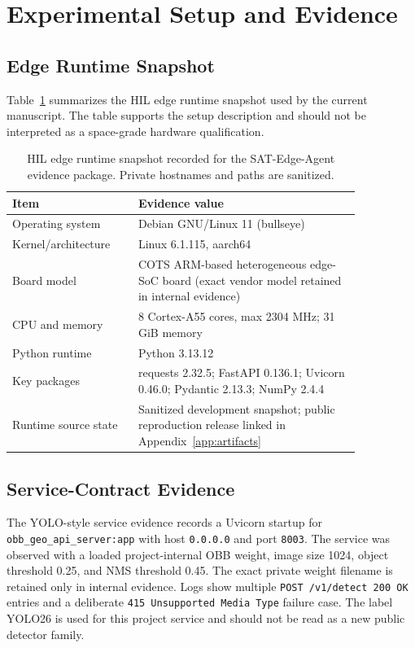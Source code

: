 
\section{Experimental Setup and Evidence}
\label{sec:results}

\subsection{Edge Runtime Snapshot}

Table~\ref{tab:runtime_snapshot} summarizes the HIL edge runtime snapshot used by the current manuscript. The table supports the setup description and should not be interpreted as a space-grade hardware qualification.

\begin{table}[htbp]
\centering
\renewcommand{\arraystretch}{1.16}
\setlength{\tabcolsep}{4pt}
\caption{HIL edge runtime snapshot recorded for the SAT-Edge-Agent evidence package. Private hostnames and paths are sanitized.}
\label{tab:runtime_snapshot}
\begin{tabular}{p{0.30\linewidth}p{0.55\linewidth}}
\toprule
\rowcolor{gray!12}
\textbf{Item} & \textbf{Evidence value} \\
\midrule
Operating system & Debian GNU/Linux 11 (bullseye) \\
\rowcolor{graybg}
Kernel/architecture & Linux 6.1.115, aarch64 \\
Board model & COTS ARM-based heterogeneous edge-SoC board (exact vendor model retained in internal evidence) \\
\rowcolor{graybg}
CPU and memory & 8 Cortex-A55 cores, max 2304 MHz; 31 GiB memory \\
Python runtime & Python 3.13.12 \\
\rowcolor{graybg}
Key packages & requests 2.32.5; FastAPI 0.136.1; Uvicorn 0.46.0; Pydantic 2.13.3; NumPy 2.4.4 \\
Runtime source state & Sanitized development snapshot; public reproduction release linked in Appendix~\ref{app:artifacts} \\
\bottomrule
\end{tabular}
\end{table}

\subsection{Service-Contract Evidence}

The YOLO-style service evidence records a Uvicorn startup for \texttt{obb\_geo\_api\_server:app} with host \texttt{0.0.0.0} and port \texttt{8003}. The service was observed with a loaded project-internal OBB weight, image size 1024, object threshold 0.25, and NMS threshold 0.45. The exact private weight filename is retained only in internal evidence. Logs show multiple \texttt{POST /v1/detect 200 OK} entries and a deliberate \texttt{415 Unsupported Media Type} failure case. The label YOLO26 is used for this project service and should not be read as a new public detector family.


